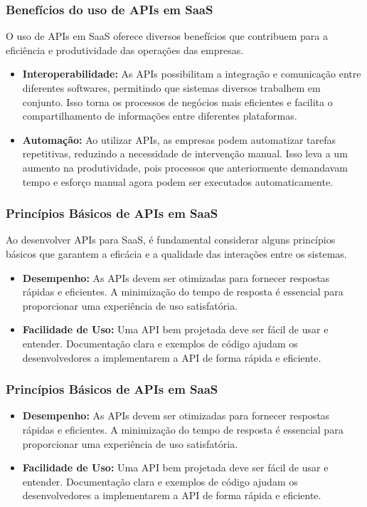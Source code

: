 \documentclass{beamer}
\begin{document}
\begin{frame}
	\frametitle{Benefícios do uso de APIs em SaaS}

	O uso de APIs em SaaS oferece diversos benefícios que contribuem para a eficiência e produtividade das operações das empresas.

	\begin{itemize}
		\item \textbf{Interoperabilidade:} As APIs possibilitam a integração e comunicação entre diferentes softwares, permitindo que sistemas diversos trabalhem em conjunto. Isso torna os processos de negócios mais eficientes e facilita o compartilhamento de informações entre diferentes plataformas.
		\item \textbf{Automação:} Ao utilizar APIs, as empresas podem automatizar tarefas repetitivas, reduzindo a necessidade de intervenção manual. Isso leva a um aumento na produtividade, pois processos que anteriormente demandavam tempo e esforço manual agora podem ser executados automaticamente.
	\end{itemize}

\end{frame}

\begin{frame}
	\frametitle{Princípios Básicos de APIs em SaaS}

	Ao desenvolver APIs para SaaS, é fundamental considerar alguns princípios básicos que garantem a eficácia e a qualidade das interações entre os sistemas.
	\begin{itemize}
		\item \textbf{Desempenho:} As APIs devem ser otimizadas para fornecer respostas rápidas e eficientes. A minimização do tempo de resposta é essencial para proporcionar uma experiência de uso satisfatória.
		\item \textbf{Facilidade de Uso:} Uma API bem projetada deve ser fácil de usar e entender. Documentação clara e exemplos de código ajudam os desenvolvedores a implementarem a API de forma rápida e eficiente.
	\end{itemize}



\end{frame}

\begin{frame}
	\frametitle{Princípios Básicos de APIs em SaaS}

	\begin{itemize}
		\item \textbf{Desempenho:} As APIs devem ser otimizadas para fornecer respostas rápidas e eficientes. A minimização do tempo de resposta é essencial para proporcionar uma experiência de uso satisfatória.
		\item \textbf{Facilidade de Uso:} Uma API bem projetada deve ser fácil de usar e entender. Documentação clara e exemplos de código ajudam os desenvolvedores a implementarem a API de forma rápida e eficiente.
	\end{itemize}


\end{frame}
\end{document}
